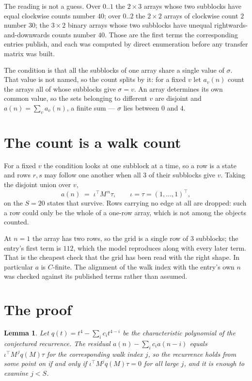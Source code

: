 \documentclass[11pt,a4paper]{article}
\theoremstyle{plain}
\newtheorem{lemma}[theorem]{Lemma}
\theoremstyle{definition}
\begin{document}
The reading is not a guess. Over $0..1$ the $2\times3$ arrays whose two subblocks have equal
clockwise counts number $40$; over $0..2$ the $2\times2$ arrays of clockwise count $2$ number
$30$; the $3\times2$ binary arrays whose two subblocks have unequal rightwards-and-downwards
counts number $40$. Those are the first terms the corresponding entries publish, and each was
computed by direct enumeration before any transfer matrix was built.

The condition is that all the subblocks of one array share a single value of $\sigma$. That
value is not named, so the count splits by it: for a fixed $v$ let $a_v(n)$ count the arrays all
of whose subblocks give $\sigma=v$. An array determines its own common value, so the sets
belonging to different $v$ are disjoint and $a(n)=\sum_v a_v(n)$, a finite sum --- $\sigma$
lies between $0$ and $4$.

\section{The count is a walk count}

For a fixed $v$ the condition looks at one subblock at a time, so a row is
a state and rows $r,s$ may follow one another when all $3$ of their subblocks give $v$.
Taking the disjoint union over $v$,
\[
a(n)\;=\;\iota^{\!\top}M^{\,n}\tau,\qquad\iota=\tau=(1,\dots,1)^{\!\top},
\]
on the $S=20$ states that survive. Rows carrying no edge at all are dropped: such a row could
only be the whole of a one-row array, which is not among the objects counted.

At $n=1$ the array has two rows, so the grid is a single row of $3$
subblocks; the entry's first term is $112$, which the model
reproduces along with every later term. That is the cheapest check that the grid has been read
with the right shape.
In particular $a$ is $C$-finite. The alignment of the walk index with the entry's own $n$ was
checked against its published terms rather than assumed.

\section{The proof}

\begin{lemma}\label{lem:crit}
Let $q(t)=t^{4}-\sum_i c_it^{4-i}$ be the characteristic polynomial of the
conjectured recurrence. The residual $a(n)-\sum_ic_ia(n-i)$ equals
$\iota^{\!\top}M^{\,j}q(M)\tau$ for the corresponding walk index $j$, so the recurrence
holds from some point on if and only if $\iota^{\!\top}M^{j}q(M)\tau=0$ for all large $j$,
and it is enough to examine $j<S$.
\end{lemma}
\end{document}
